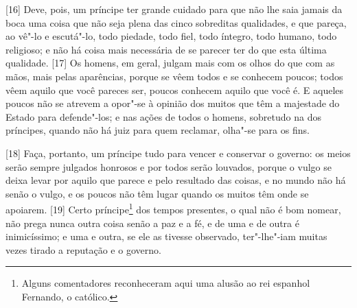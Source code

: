 {[}16{]} Deve, pois, um príncipe ter grande cuidado para que não lhe
saia jamais da boca uma coisa que não seja plena das cinco sobreditas
qualidades, e que pareça, ao vê"-lo e escutá"-lo, todo piedade, todo
fiel, todo íntegro, todo humano, todo religioso; e não há coisa mais
necessária de se parecer ter do que esta última qualidade. {[}17{]} Os
homens, em geral, julgam mais com os olhos do que com as mãos, mais
pelas aparências, porque se vêem todos e se conhecem poucos; todos vêem
aquilo que você pareces ser, poucos conhecem aquilo que você é. E
aqueles poucos não se atrevem a opor"-se à opinião dos muitos que têm a
majestade do Estado para defende"-los; e nas ações de todos o homens,
sobretudo na dos príncipes, quando não há juiz para quem reclamar,
olha"-se para os fins.

{[}18{]} Faça, portanto, um príncipe tudo para vencer e conservar o
governo: os meios serão sempre julgados honrosos e por todos serão
louvados, porque o vulgo se deixa levar por aquilo que parece e pelo
resultado das coisas, e no mundo não há senão o vulgo, e os poucos não
têm lugar quando os muitos têm onde se apoiarem. {[}19{]} Certo
príncipe\footnote{Alguns comentadores reconheceram aqui uma alusão ao
  rei espanhol Fernando, o católico.} dos tempos presentes, o qual não é
bom nomear, não prega nunca outra coisa senão a paz e a fé, e de uma e
de outra é inimicíssimo; e uma e outra, se ele as tivesse observado,
ter"-lhe"-iam muitas vezes tirado a reputação e o governo.


